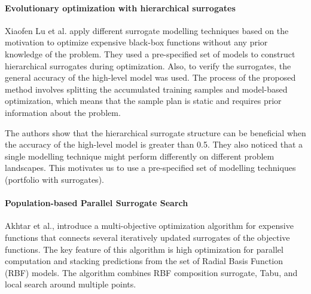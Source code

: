         \paragraph{Evolutionary optimization with hierarchical surrogates} Xiaofen Lu et al. \cite{LuST19} apply different surrogate modelling techniques based on the motivation to optimize expensive black-box functions without any prior knowledge of the problem. They used a pre-specified set of models to construct hierarchical surrogates during optimization. Also, to verify the surrogates, the general accuracy of the high-level model was used. The process of the proposed method involves splitting the accumulated training samples and model-based optimization, which means that the sample plan is static and requires prior information about the problem. 

        The authors show that the hierarchical surrogate structure can be beneficial when the accuracy of the high-level model is greater than 0.5. They also noticed that a single modelling technique might perform differently on different problem landscapes. This motivates us to use a pre-specified set of modelling techniques (portfolio with surrogates).
        
        \paragraph{Population-based Parallel Surrogate Search} Akhtar et al.,\cite{akhtar2019efficient} introduce a multi-objective optimization algorithm for expensive functions that connects several iteratively updated surrogates of the objective functions. The key feature of this algorithm is high optimization for parallel computation and stacking predictions from the set of Radial Basis Function (RBF) models. The algorithm combines RBF composition surrogate, Tabu, and local search around multiple points. 


